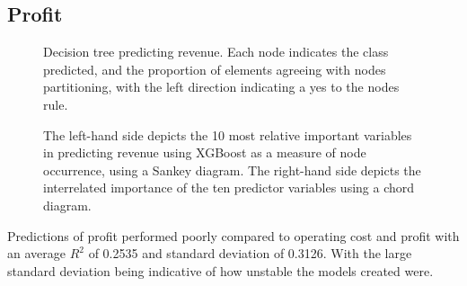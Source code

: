 \documentclass[review,12pt,authoryear]{elsarticle}
\begin{document}
\begin{linenumbers}
 \subsection{Profit}

 \begin{figure}[htb]
  \caption{Decision tree predicting revenue. Each node indicates the class predicted, and the proportion of elements agreeing with nodes partitioning, with the left direction indicating a yes to the nodes rule.}\label{fig:revenue_tree}
 \end{figure}
 
\begin{figure}[htb]
  \caption{The left-hand side depicts the 10 most relative important variables in predicting revenue using XGBoost as a measure of node occurrence, using a Sankey diagram. The right-hand side depicts the interrelated importance of the ten predictor variables using a chord diagram.}\label{fig:profit}
 \end{figure}

Predictions of profit performed poorly compared to operating cost and profit with an average $R^2$ of 0.2535 and standard deviation of 0.3126. With the large standard deviation being indicative of how unstable the models created were.

\end{linenumbers}
 
\end{document}
